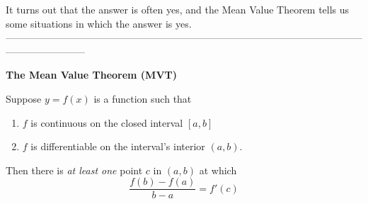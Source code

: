 \documentclass[12pt]{report}
\begin{document}
It turns out that the answer is often yes, and the Mean Value Theorem tells us some situations in which the answer is yes.  \\

------------------------------------------------------------------------------------------------------------------------------------

\begin{center}
\textbf{The Mean Value Theorem (MVT)}
\end{center}

Suppose $y = f(x)$ is a function such that \\

\begin{enumerate}

\item $f$ is continuous on the closed interval $[a,b]$ \\

\item $f$ is differentiable on the interval's interior $(a,b)$.  \\

\end{enumerate}

Then there is \textit{at least one} point $c$ in $(a,b)$ at which \\

$$\frac{f(b) - f(a)}{b-a} = f'(c)$$
\end{document}
